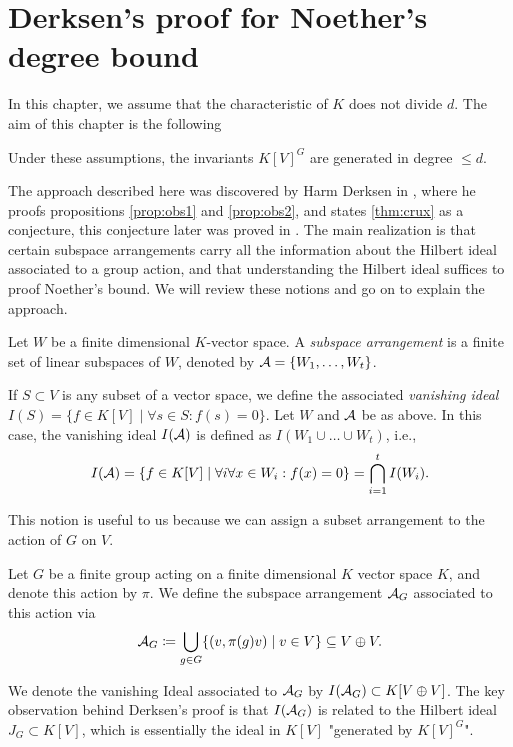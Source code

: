 \documentclass[../main.tex]{subfiles}
\begin{document}
\section{Derksen's proof for Noether's degree bound}
In this chapter, we assume that the characteristic of $K$ does not divide $d$. 
The aim of this chapter is the following
\begin{thm}\label{thm:generalNoether}
    Under these assumptions, the invariants $K[V]^G$ are generated in 
    degree $\leq d$.
\end{thm}

The approach described here was discovered by Harm Derksen in
\cite{DERKSENProofIdea}, where he proofs propositions \ref{prop:obs1} and 
\ref{prop:obs2}, and states \ref{thm:crux} as a conjecture, 
this conjecture later was proved in \cite{DERKSENRegularity}. 
The main realization is
that certain subspace arrangements carry all the information about the Hilbert ideal
associated to a group action, and that understanding the Hilbert ideal suffices to
proof Noether's bound. We will review these notions and go on to explain the 
approach.

\begin{defi}
    Let $W$ be a finite dimensional $K$-vector space. A \emph{subspace
    arrangement} is a finite set of linear subspaces of $W$, denoted by $\mathcal{A} =
    \{W_1, \dots, W_t\}$. 
\end{defi}

\begin{defi}
    If $S \subset V$ is any subset of a vector space, we define the associated
    \emph{vanishing ideal}
    $I(S) = \{f \in K[V] \mid \forall s \in S: f(s) = 0\}$.
    Let $W$ and $\mathcal{A}$ be as above. In this case, the vanishing ideal $I(\mathcal{A})$
    is defined as $I(W_1 \cup \dots \cup W_t)$, i.e.,
    \begin{equation*}
        I(\mathcal{A}) = \{f \in K[V] \mid \forall i \forall x \in W_i: f(x) = 0\} =
        \bigcap_{i=1}^t I(W_i).
    \end{equation*}
\end{defi}

This notion is useful to us because we can assign a subset arrangement to the
action of $G$ on $V$.
\begin{defi}
    Let $G$ be a finite group acting on a finite dimensional $K$ vector space $K$, 
    and denote this action by $\pi$.
    We define the subspace arrangement $\mathcal{A}_G$ associated to this action via
    \begin{equation*}
        \mathcal{A}_G \coloneqq \bigcup_{g \in G}\{(v,\pi(g)v) \mid v \in V\}
        \subseteq V \oplus V.
    \end{equation*}
\end{defi}
We denote the vanishing Ideal associated to $\mathcal{A}_G$ by $I(\mathcal{A}_G) \subset K[V \oplus V]$. 
The key observation behind Derksen's proof is that $I(\mathcal{A}_G)$ is related to the Hilbert ideal
$J_G \subset K[V]$, which is essentially the ideal in $K[V]$ "generated by $K[V]^G$".
\end{document}
